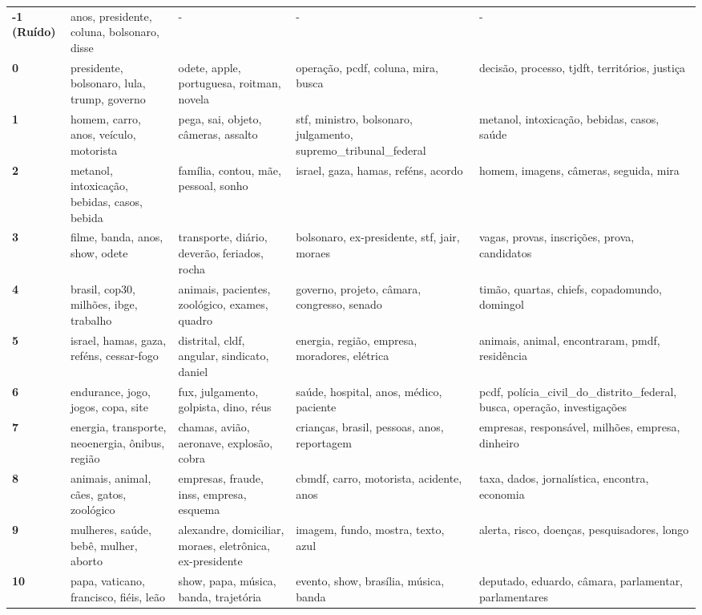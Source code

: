 \begin{xltabular}{\textwidth}{@{}l >{\RaggedRight\arraybackslash}X >{\RaggedRight\arraybackslash}X >{\RaggedRight\arraybackslash}X >{\RaggedRight\arraybackslash}X@{}}
    \textbf{-1 (Ruído)} & anos, presidente, coluna, bolsonaro, disse & - & - & - \\
    \textbf{0} & presidente, bolsonaro, lula, trump, governo & odete, apple, portuguesa, roitman, novela & operação, pcdf, coluna, mira, busca & decisão, processo, tjdft, territórios, justiça \\
    \textbf{1} & homem, carro, anos, veículo, motorista & pega, sai, objeto, câmeras, assalto & stf, ministro, bolsonaro, julgamento, supremo\_tribunal\_federal & metanol, intoxicação, bebidas, casos, saúde \\
    \textbf{2} & metanol, intoxicação, bebidas, casos, bebida & família, contou, mãe, pessoal, sonho & israel, gaza, hamas, reféns, acordo & homem, imagens, câmeras, seguida, mira \\
    \textbf{3} & filme, banda, anos, show, odete & transporte, diário, deverão, feriados, rocha & bolsonaro, ex-presidente, stf, jair, moraes & vagas, provas, inscrições, prova, candidatos \\
    \textbf{4} & brasil, cop30, milhões, ibge, trabalho & animais, pacientes, zoológico, exames, quadro & governo, projeto, câmara, congresso, senado & timão, quartas, chiefs, copadomundo, domingol \\
    \textbf{5} & israel, hamas, gaza, reféns, cessar-fogo & distrital, cldf, angular, sindicato, daniel & energia, região, empresa, moradores, elétrica & animais, animal, encontraram, pmdf, residência \\
    \textbf{6} & endurance, jogo, jogos, copa, site & fux, julgamento, golpista, dino, réus & saúde, hospital, anos, médico, paciente & pcdf, polícia\_civil\_do\_distrito\_federal, busca, operação, investigações \\
    \textbf{7} & energia, transporte, neoenergia, ônibus, região & chamas, avião, aeronave, explosão, cobra & crianças, brasil, pessoas, anos, reportagem & empresas, responsável, milhões, empresa, dinheiro \\
    \textbf{8} & animais, animal, cães, gatos, zoológico & empresas, fraude, inss, empresa, esquema & cbmdf, carro, motorista, acidente, anos & taxa, dados, jornalística, encontra, economia \\
    \textbf{9} & mulheres, saúde, bebê, mulher, aborto & alexandre, domiciliar, moraes, eletrônica, ex-presidente & imagem, fundo, mostra, texto, azul & alerta, risco, doenças, pesquisadores, longo \\
    \textbf{10} & papa, vaticano, francisco, fiéis, leão & show, papa, música, banda, trajetória & evento, show, brasília, música, banda & deputado, eduardo, câmara, parlamentar, parlamentares \\

\end{xltabular}
